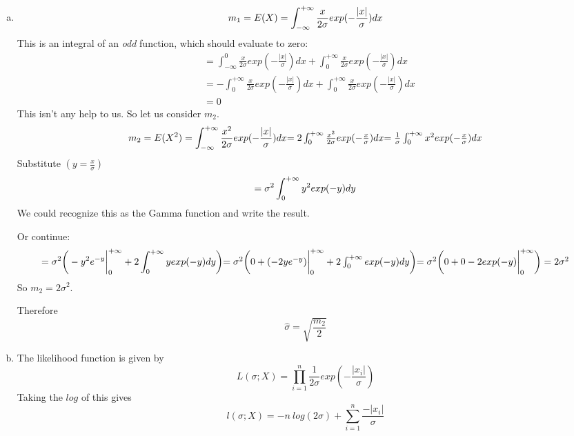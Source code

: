 \documentclass[12pt]{article}
\begin{document}
  \begin{enumerate}[(a)]
\item \begin{equation*}
m_1 = E(X) = \int_{-\infty}^{+\infty}\frac{x}{2\sigma}exp(- \frac{|x|}{\sigma})dx $$\\$$
\end{equation*}
This is an integral of an \emph{odd} function, which should evaluate to zero:
\begin{align*}
      &= \int_{-\infty}^{0}\frac{x}{2\sigma}exp(- \frac{|x|}{\sigma})dx + \int_{0}^{+\infty}\frac{x}{2\sigma}exp(- \frac{|x|}{\sigma})dx \\
     &=-\int_{0}^{+\infty}\frac{x}{2\sigma}exp(- \frac{|x|}{\sigma})dx + \int_{0}^{+\infty}\frac{x}{2\sigma}exp(- \frac{|x|}{\sigma})dx \\
     & = 0
\end{align*}
This isn't any help to us. So let us consider $m_2$.
\begin{equation*}
m_2 = E(X^2) = \int_{-\infty}^{+\infty}\frac{x^2}{2\sigma}exp(- \frac{|x|}{\sigma})dx$$\\$$
    = 2\int_{0}^{+\infty}\frac{x^2}{2\sigma}exp(- \frac{x}{\sigma})dx$$\\$$
    = \frac{1}{\sigma}\int_{0}^{+\infty} x^2 exp(- \frac{x}{\sigma})dx
\end{equation*}
Substitute $(y = \frac{x}{\sigma})$
\begin{equation*}
    = \sigma^2\int_{0}^{+\infty} y^2 exp(-y)dy$$\\$$
\end{equation*}
We could recognize this as the Gamma function and write the result. 

Or continue:
\begin{equation*}
    = \sigma^2\bigg(-y^2e^{-y}\bigg|_0^{+\infty} + 2\int_{0}^{+\infty} y exp(-y)dy\bigg)$$\\$$
    = \sigma^2 \bigg( 0 + (-2ye^{-y})\bigg|_0^{+\infty} + 2\int_{0}^{+\infty} exp(-y)dy\bigg)$$\\$$
    = \sigma^2 \bigg( 0 + 0 - 2exp(-y)\bigg|_{0}^{+\infty}\bigg) = 2\sigma^2 
\end{equation*}
So $m_2 = 2\sigma^2$.

Therefore
 $$\boxed{\hat \sigma = \sqrt{\frac{m_2}{2}} }$$

\bigskip
\item The likelihood function is given by 
\begin{equation*}
L(\sigma;X) = \prod_{i=1}^n \frac{1}{2\sigma} exp(-\frac{|x_i|}{\sigma})
\end{equation*}
Taking the $log$ of this gives 
\begin{equation*}
l(\sigma;X) = -n\: log(2\sigma) + \sum_{i=1}^n \frac{-|x_i|}{\sigma}
\end{equation*}


\end{enumerate}
\end{document}
